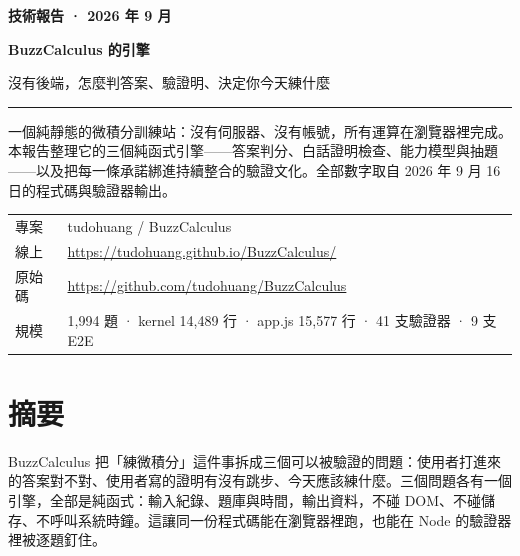 \documentclass[11pt,a4paper,oneside]{report}
\renewcommand{\_}{\ifmmode\origunderscore\else\textunderscore\allowbreak\fi}
\begin{document}
\begin{titlepage}
  \thispagestyle{empty}
  \vspace*{28mm}
  {\color{gold}\sffamily\bfseries\small 技術報告 · 2026 年 9 月\par}
  \vspace{10mm}
  {\sffamily\bfseries\fontsize{34}{42}\selectfont BuzzCalculus 的引擎\par}
  \vspace{6mm}
  {\fontsize{16}{24}\selectfont\color{muted} 沒有後端，怎麼判答案、驗證明、決定你今天練什麼\par}
  \vspace{14mm}
  {\color{gold}\rule{0.32\textwidth}{2pt}\par}
  \vspace{14mm}
  \begin{minipage}{0.9\textwidth}
    \large
    一個純靜態的微積分訓練站：沒有伺服器、沒有帳號，所有運算在瀏覽器裡完成。本報告整理它的三個純函式引擎——答案判分、白話證明檢查、能力模型與抽題——以及把每一條承諾綁進持續整合的驗證文化。全部數字取自 2026 年 9 月 16 日的程式碼與驗證器輸出。
  \end{minipage}
  \vfill
  {\small
  \begin{tabular}{@{}lp{}@{}}
    \sffamily\color{muted}專案 & tudohuang / BuzzCalculus \\
    \sffamily\color{muted}線上 & \url{https://tudohuang.github.io/BuzzCalculus/} \\
    \sffamily\color{muted}原始碼 & \url{https://github.com/tudohuang/BuzzCalculus} \\
    \sffamily\color{muted}規模 & 1,994 題 · kernel 14,489 行 · app.js 15,577 行 · 41 支驗證器 · 9 支 E2E \\
  \end{tabular}}
\end{titlepage}

\chapter*{摘要}
BuzzCalculus 把「練微積分」這件事拆成三個可以被驗證的問題：使用者打進來的答案對不對、使用者寫的證明有沒有跳步、今天應該練什麼。三個問題各有一個引擎，全部是純函式：輸入紀錄、題庫與時間，輸出資料，不碰 DOM、不碰儲存、不呼叫系統時鐘。這讓同一份程式碼能在瀏覽器裡跑，也能在 Node 的驗證器裡被逐題釘住。
\end{document}
